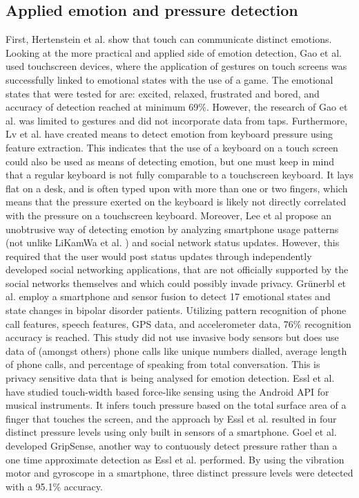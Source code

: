 \documentclass{sigchi}
\begin{document}
\subsection{Applied emotion and pressure detection} %
\label{sub:practical_applications}
First, Hertenstein et al. \cite{Hertenstein2006} show that touch can communicate distinct emotions. Looking at the more practical and applied side of emotion detection, Gao et al. \cite{Gao2012} used touchscreen devices, where the application of gestures on touch screens was successfully linked to emotional states with the use of a game. The emotional states that were tested for are: excited, relaxed, frustrated and bored, and accuracy of detection reached at minimum 69\%. However, the research of Gao et al. was limited to gestures and did not incorporate data from taps. Furthermore, Lv et al. \cite{H.R.LvZ.L.LinW.J.Yin2008} have created means to detect emotion from keyboard pressure using feature extraction. This indicates that the use of a keyboard on a touch screen could also be used as means of detecting emotion, but one must keep in mind that a regular keyboard is not fully comparable to a touchscreen keyboard. It lays flat on a desk, and is often typed upon with more than one or two fingers, which means that the pressure exerted on the keyboard is likely not directly correlated with the pressure on a touchscreen keyboard. Moreover, Lee et al \cite{Lee2012} propose an unobtrusive way of detecting emotion by analyzing smartphone usage patterns (not unlike LiKamWa et al. \cite{Likamwa2013}) and social network status updates. However, this required that the user would post status updates through independently developed social networking applications, that are not officially supported by the social networks themselves and which could possibly invade privacy. Grünerbl et al. \cite{Grunerbl2015} employ a smartphone and sensor fusion to detect 17 emotional states and state changes in bipolar disorder patients. Utilizing pattern recognition of phone call features, speech features, GPS data, and accelerometer data, 76\% recognition accuracy is reached. This study did not use invasive body sensors but does use data of (amongst others) phone calls like unique numbers dialled, average length of phone calls, and percentage of speaking from total conversation. This is privacy sensitive data that is being analysed for emotion detection. Essl et al. \cite{Essl2010} have studied touch-width based force-like sensing using the Android API for musical instruments. It infers touch pressure based on the total surface area of a finger that touches the screen, and the approach by Essl et al. resulted in four distinct pressure levels using only built in sensors of a smartphone. Goel et al. \cite{Goel2012} developed GripSense, another way to contuously detect pressure rather than a one time approximate detection as Essl et al. performed. By using the vibration motor and gyroscope in a smartphone, three distinct pressure levels were detected with a 95.1\% accuracy.
\end{document}
